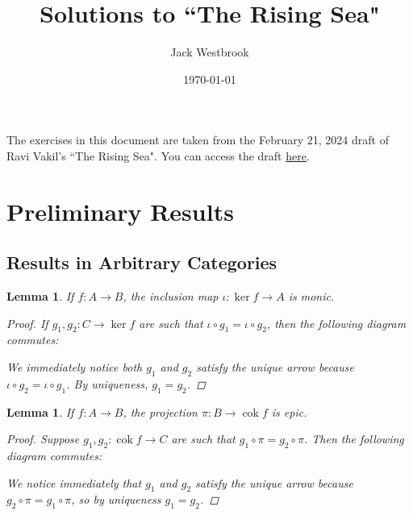 \documentclass{article}
\title{Solutions to ``The Rising Sea"}
\author{Jack Westbrook}
\date\today
\DeclareMathOperator{\cok}{\mathrm{cok}}
\newtheorem{lemma}[theorem]{Lemma}
\begin{document}
\maketitle %

The exercises in this document are taken from the February 21, 2024 draft of Ravi Vakil's ``The Rising Sea".
You can access the draft \href{https://math.stanford.edu/~vakil/216blog/FOAGfeb2124public.pdf}{here}.

\section*{Preliminary Results}
\subsection*{Results in Arbitrary Categories}
\begin{lemma}\label{lem:ker monic}
    If $f:A\to B$, the inclusion map $\iota:\ker f\to A$ is monic.
    \begin{proof}
        If $g_1,g_2:C\to \ker f$ are such that $\iota\circ g_1=\iota\circ g_2$, then the following diagram commutes:
        \begin{center}
        \end{center}
        We immediately notice both $g_1$ and $g_2$ satisfy the unique arrow because $\iota\circ g_2=\iota\circ g_1$. By uniqueness, $g_1=g_2$.
    \end{proof}
\end{lemma}
\begin{lemma}\label{lem:cok epic}
    If $f:A\to B$, the projection $\pi:B \to \cok f$ is epic.
    \begin{proof}
        Suppose $g_1,g_2:\cok f\to C$ are such that $g_1\circ \pi=g_2\circ \pi$. Then the following diagram commutes:
        \begin{center}
        \end{center}
        We notice immediately that $g_1$ and $g_2$ satisfy the unique arrow because $g_2\circ \pi=g_1\circ \pi$, so by uniqueness $g_1=g_2$.
    \end{proof}
\end{lemma}
\end{document}
